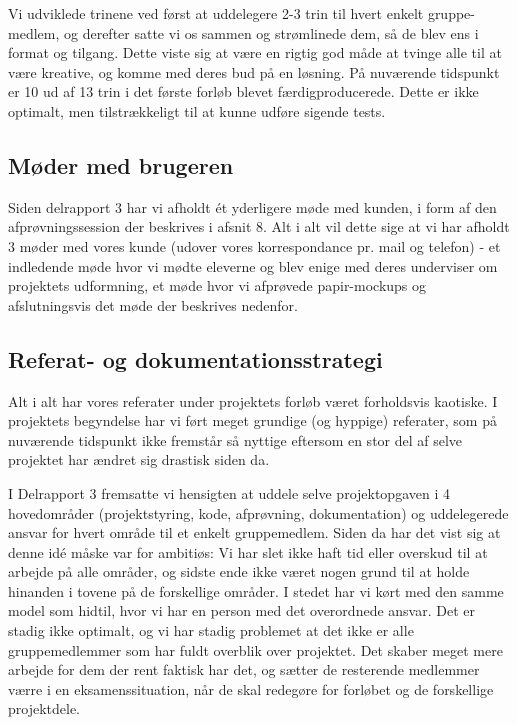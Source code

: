 \documentclass[10pt,a4paper,danish]{article}
\begin{document}
Vi udviklede trinene ved først at uddelegere 2-3 trin til hvert enkelt gruppe-
medlem, og derefter satte vi os sammen og strømlinede dem, så de blev ens i
format og tilgang. Dette viste sig at være en rigtig god måde at tvinge alle
til at være kreative, og komme med deres bud på en løsning. På nuværende tidspunkt
er 10 ud af 13 trin i det første forløb blevet færdigproducerede. Dette er ikke 
optimalt, men tilstrækkeligt til at kunne udføre sigende tests.

\subsection{Møder med brugeren}
Siden delrapport 3 har vi afholdt ét yderligere møde med kunden, i form af 
den afprøvningssession der beskrives i afsnit 8. Alt i alt vil dette sige 
at vi har afholdt 3 møder med vores kunde (udover vores korrespondance pr. 
mail og telefon) - et indledende møde hvor vi mødte eleverne og blev enige
med deres underviser om projektets udformning, et møde hvor vi afprøvede 
papir-mockups og afslutningsvis det møde der beskrives nedenfor. 

\subsection{Referat- og dokumentationsstrategi}
Alt i alt har vores referater under projektets forløb været forholdsvis 
kaotiske. I projektets begyndelse har vi ført meget grundige (og hyppige)
referater, som på nuværende tidspunkt ikke fremstår så nyttige eftersom 
en stor del af selve projektet har ændret sig drastisk siden da. 

I Delrapport 3 fremsatte vi hensigten at uddele selve projektopgaven i 4 hovedområder
(projektstyring, kode, afprøvning, dokumentation) og uddelegerede ansvar for hvert 
område til et enkelt gruppemedlem. Siden da har det vist sig at denne idé måske var
for ambitiøs: Vi har slet ikke haft tid eller overskud til at arbejde på alle områder, 
og sidste ende ikke været nogen grund til at holde hinanden i tovene på de forskellige
områder. I stedet har vi kørt med den samme model som hidtil, hvor vi har en person med 
det overordnede ansvar. Det er stadig ikke optimalt, og vi har stadig problemet at det 
ikke er alle gruppemedlemmer som har fuldt overblik over projektet.
Det skaber meget mere arbejde for dem der rent faktisk har det,
og sætter de resterende medlemmer værre i en eksamenssituation, når de
skal redegøre for forløbet og de forskellige projektdele.
\end{document}
